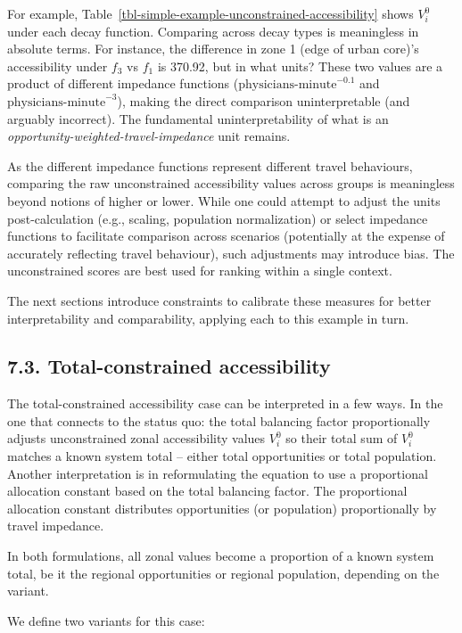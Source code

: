 \documentclass[
  10pt,
  letterpaper,
]{article}
\begin{document}
For example, Table~\ref{tbl-simple-example-unconstrained-accessibility}
shows \(V^0_{i}\) under each decay function. Comparing across decay
types is meaningless in absolute terms. For instance, the difference in
zone 1 (edge of urban core)'s accessibility under \(f_3\) vs \(f_1\) is
370.92, but in what units? These two values are a product of different
impedance functions (\(\text{physicians-minute}^{-0.1}\) and
\(\text{physicians-minute}^{-3}\)), making the direct comparison
uninterpretable (and arguably incorrect). The fundamental
uninterpretability of what is an
\emph{opportunity-weighted-travel-impedance} unit remains.

As the different impedance functions represent different travel
behaviours, comparing the raw unconstrained accessibility values across
groups is meaningless beyond notions of higher or lower. While one could
attempt to adjust the units post-calculation (e.g., scaling, population
normalization) or select impedance functions to facilitate comparison
across scenarios (potentially at the expense of accurately reflecting
travel behaviour), such adjustments may introduce bias. The
unconstrained scores are best used for ranking within a single context.

The next sections introduce constraints to calibrate these measures for
better interpretability and comparability, applying each to this example
in turn.

\subsection{7.3. Total-constrained
accessibility}\label{total-constrained-accessibility}

The total-constrained accessibility case can be interpreted in a few
ways. In the one that connects to the status quo: the total balancing
factor proportionally adjusts unconstrained zonal accessibility values
\(V^0_i\) so their total sum of \(V^0_i\) matches a known system total
-- either total opportunities or total population. Another
interpretation is in reformulating the equation to use a proportional
allocation constant based on the total balancing factor. The
proportional allocation constant distributes opportunities (or
population) proportionally by travel impedance.

In both formulations, all zonal values become a proportion of a known
system total, be it the regional opportunities or regional population,
depending on the variant.

We define two variants for this case:
\end{document}
